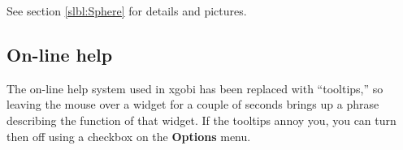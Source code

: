 \documentclass[11pt]{article}
\begin{document}
See section \ref{slbl:Sphere} for details and pictures.

\subsection{On-line help}

The on-line help system used in xgobi has been replaced with
``tooltips,'' so leaving the mouse over a widget for a couple of
seconds brings up a phrase describing the function of that widget.
If the tooltips annoy you, you can turn then off using a
checkbox on the {\bf Options} menu.
\end{document}
